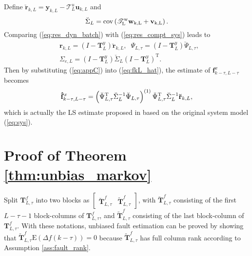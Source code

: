 \documentclass[twocolumn]{autart}
\begin{document}
Define $\mathbf{\breve r}_{k,L} = \mathbf{y}_{k,L} - \mathscr{T}_L^u \mathbf{u}_{k,L}$ and
$${\breve \Sigma}_{L} = \rm{cov} \left( \mathscr{T}_{L}^{w} \mathbf{w}_{k,L} + \mathbf{v}_{k,L} \right).$$
Comparing (\ref{eq:res_dyn_batch}) with (\ref{eq:res_compt_sys}) leads to
\begin{equation}\label{eq:appC}
\begin{aligned}
&\mathbf{r}_{k,L} = \left( I - \mathbf{T}_L^y \right) \mathbf{\breve r}_{k,L}, \;\;
\Psi_{L,\tau} = \left( I - \mathbf{T}_L^y \right) {\breve \Psi}_{L,\tau}, \\
&\Sigma_{e,L} = \left( I - \mathbf{T}_L^y \right) {\breve \Sigma}_{L} \left( I - \mathbf{T}_L^y \right)^\mathrm{T}.
\end{aligned}
\end{equation}
Then by substituting (\ref{eq:appC}) into (\ref{eq:fkL_hat}), the estimate of ${{\mathbf{{{f}}}}_{k-\tau,L-\tau}^x}$ becomes
\begin{equation}\label{eq:fkL_hat_1}
{{\mathbf{\hat {{f}}}}_{k-\tau,L-\tau}^x} = \left( {\breve \Psi}_{L,\tau}^\mathrm{T} {\breve \Sigma}_{L}^{-1} {\breve \Psi}_{L,\tau} \right)^{(1)}
{\breve \Psi}_{L,\tau}^\mathrm{T} {\breve \Sigma}_{L}^{-1} {{\bf{\breve r}}_{k,L}},
\end{equation}
which is actually the LS estimate proposed in \cite{Wan2014} based on the original system model (\ref{eq:sys}).




\section{Proof of Theorem \ref{thm:unbias_markov}}\label{app:unbias_markov}

Split $\mathbf{T}_{L,\tau}^f$ into two blocks as
$\left[ \begin{array}{cc}
                                       \mathbf{\breve T}_{L,\tau}^{f} & \mathbf{\tilde T}_{L,\tau}^{f}
                                     \end{array} \right]$,
with $\mathbf{\breve T}_{L,\tau}^{f}$ consisting of the first $L-\tau-1$ block-columns of
$\mathbf{T}_{L,\tau}^f$, and $\mathbf{\tilde T}_{L,\tau}^{f}$ consisting of the last block-column of
$\mathbf{T}_{L,\tau}^f$. With these notations, unbiased fault estimation can be proved by showing that 
$\mathbf{\tilde T}_{L,\tau}^f \text{E}(\Delta f(k-\tau)) = 0$ because $\mathbf{\tilde T}_{L,\tau}^f$ has full column rank according to Assumption 
\ref{ass:fault_rank}.
\end{document}
